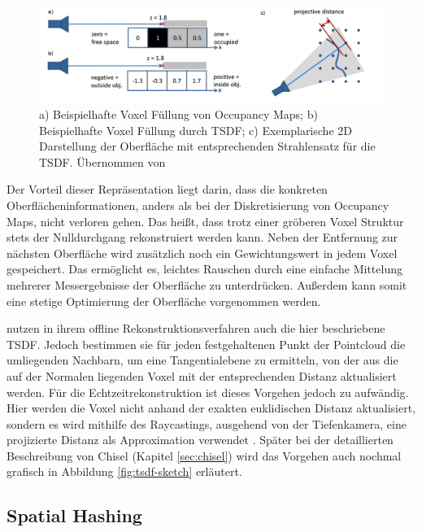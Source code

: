 \begin{figure}
  \centering
	\includegraphics[width=1.0\textwidth]{content/images/methods/tsdf.png} 
  \caption{a) Beispielhafte Voxel Füllung von Occupancy Maps; b) Beispielhafte Voxel Füllung durch TSDF; c) Exemplarische 2D Darstellung der Oberfläche mit entsprechenden Strahlensatz für die TSDF. Übernommen von \citet{Compu66:online}}
  \label{fig:tsdf}
\end{figure}

Der Vorteil dieser Repräsentation liegt darin, dass die konkreten Oberflächeninformationen, anders als bei der Diskretisierung von Occupancy Maps, nicht verloren gehen. Das heißt, dass trotz einer gröberen Voxel Struktur stets der Nulldurchgang rekonstruiert werden kann. Neben der Entfernung zur nächsten Oberfläche wird zusätzlich noch ein Gewichtungswert in jedem Voxel gespeichert. Das ermöglicht es, leichtes Rauschen durch eine einfache Mittelung mehrerer Messergebnisse der Oberfläche zu unterdrücken. Außerdem kann somit eine stetige Optimierung der Oberfläche vorgenommen werden. \citep{Compu66:online}

\citet{hoppe1992surface} nutzen in ihrem offline Rekonstruktionsverfahren auch die hier beschriebene TSDF. Jedoch bestimmen sie für jeden festgehaltenen Punkt der Pointcloud die umliegenden Nachbarn, um eine Tangentialebene zu ermitteln, von der aus die auf der Normalen liegenden Voxel mit der entsprechenden Distanz aktualisiert werden. Für die Echtzeitrekonstruktion ist dieses Vorgehen jedoch zu aufwändig. Hier werden die Voxel nicht anhand der exakten euklidischen Distanz aktualisiert, sondern es wird mithilfe des Raycastings, ausgehend von der Tiefenkamera, eine projizierte Distanz als Approximation verwendet \citep{Compu66:online}. Später bei der detaillierten Beschreibung von Chisel (Kapitel \ref{sec:chisel}) wird das Vorgehen auch nochmal grafisch in Abbildung \ref{fig:tsdf-sketch} erläutert.

\subsection{Spatial Hashing}

